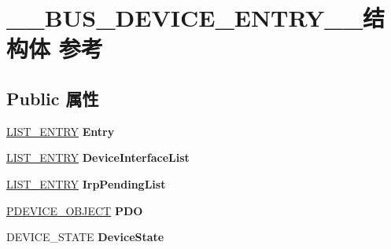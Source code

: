 \hypertarget{struct_____b_u_s___d_e_v_i_c_e___e_n_t_r_y____}{}\section{\+\_\+\+\_\+\+B\+U\+S\+\_\+\+D\+E\+V\+I\+C\+E\+\_\+\+E\+N\+T\+R\+Y\+\_\+\+\_\+结构体 参考}
\label{struct_____b_u_s___d_e_v_i_c_e___e_n_t_r_y____}
\subsection*{Public 属性}
\begin{DoxyCompactItemize}
\item 
\mbox{\label{struct_____b_u_s___d_e_v_i_c_e___e_n_t_r_y_____a38153d7ef3047eec01c34fda4781f9b7}} 
\hyperlink{struct___l_i_s_t___e_n_t_r_y}{L\+I\+S\+T\+\_\+\+E\+N\+T\+RY} {\bfseries Entry}
\item 
\mbox{\label{struct_____b_u_s___d_e_v_i_c_e___e_n_t_r_y_____a129a06a64d0163e637ea7569f298ca53}} 
\hyperlink{struct___l_i_s_t___e_n_t_r_y}{L\+I\+S\+T\+\_\+\+E\+N\+T\+RY} {\bfseries Device\+Interface\+List}
\item 
\mbox{\label{struct_____b_u_s___d_e_v_i_c_e___e_n_t_r_y_____affa21c2048cb0d1717f4e6930fe0d2f1}} 
\hyperlink{struct___l_i_s_t___e_n_t_r_y}{L\+I\+S\+T\+\_\+\+E\+N\+T\+RY} {\bfseries Irp\+Pending\+List}
\item 
\mbox{\label{struct_____b_u_s___d_e_v_i_c_e___e_n_t_r_y_____a904c751d37ef4d844a1425c88e9e5efb}} 
\hyperlink{struct___d_e_v_i_c_e___o_b_j_e_c_t}{P\+D\+E\+V\+I\+C\+E\+\_\+\+O\+B\+J\+E\+CT} {\bfseries P\+DO}
\item 
\mbox{\label{struct_____b_u_s___d_e_v_i_c_e___e_n_t_r_y_____a94a1ddb2f2ce1193cc3d0604611209f6}} 
D\+E\+V\+I\+C\+E\+\_\+\+S\+T\+A\+TE {\bfseries Device\+State}
\item 
\mbox{\label{struct_____b_u_s___d_e_v_i_c_e___e_n_t_r_y_____a5905fc3bafb966f8b895e4dccdbd2d93}} 

\end{DoxyCompactItemize}
